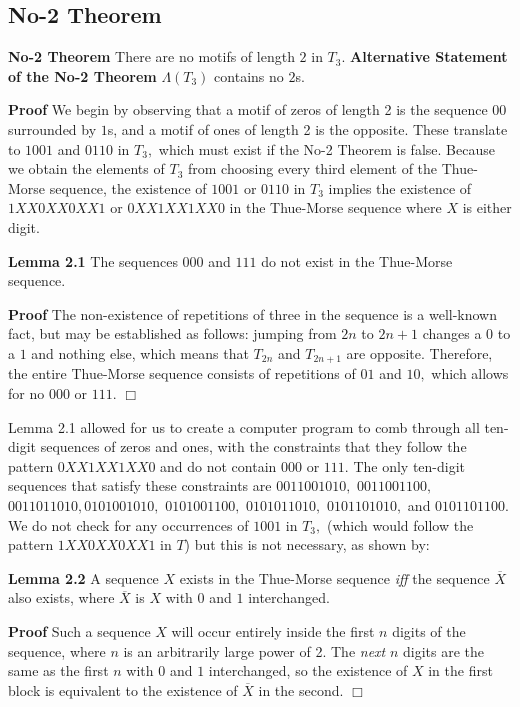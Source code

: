 \documentclass{article}
\begin{document}
\subsection{No-2 Theorem}

\textbf{No-2 Theorem} There are no motifs of length $2$ in $T_3.$
\newline
\textbf{Alternative Statement of the No-2 Theorem} $\Lambda(T_3)$ contains no $2$s.

\textbf{Proof}
We begin by observing that a motif of zeros of length 2 is the sequence $00$ surrounded by $1$s, and a motif of ones of length 2 is the opposite. These translate to $1001$ and $0110$ in $T_3,$ which must exist if the No-2 Theorem is false. Because we obtain the elements of $T_3$ from choosing every third element of the Thue-Morse sequence, the existence of $1001$ or $0110$ in $T_3$ implies the existence of $1XX0XX0XX1$ or $0XX1XX1XX0$ in the Thue-Morse sequence where $X$ is either digit.

\textbf{Lemma 2.1} The sequences $000$ and $111$ do not exist in the Thue-Morse sequence.

\textbf{Proof} The non-existence of repetitions of three in the sequence is a well-known fact, but may be established as follows: jumping from $2n$ to $2n+1$ changes a $0$ to a $1$ and nothing else, which means that $T_{2n}$ and $T_{2n+1}$ are opposite. Therefore, the entire Thue-Morse sequence consists of repetitions of $01$ and $10,$ which allows for no $000$ or $111.$ $\Box$

Lemma 2.1 allowed for us to create a computer program to comb through all ten-digit sequences of zeros and ones, with the constraints that they follow the pattern $0XX1XX1XX0$ and do not contain $000$ or $111.$  The only ten-digit sequences that satisfy these constraints are $0011001010,$ $0011001100,$ $0011011010,$$0101001010,$ $0101001100,$ $0101011010,$ $0101101010,$ and $0101101100.$ We do not check for any occurrences of $1001$ in $T_3,$ (which would follow the pattern $1XX0XX0XX1$ in $T$) but this is not necessary, as shown by:

\textbf{Lemma 2.2} A sequence $X$ exists in the Thue-Morse sequence \emph{iff} the sequence $\overline{X}$ also exists, where $\overline{X}$ is $X$ with $0$ and $1$ interchanged.

\textbf{Proof} Such a sequence $X$ will occur entirely inside the first $n$ digits of the sequence, where $n$ is an arbitrarily large power of 2. The \emph{next} $n$ digits are the same as the first $n$ with $0$ and $1$ interchanged, so the existence of $X$ in the first block is equivalent to the existence of $\overline{X}$ in the second. $\Box$
\end{document}
